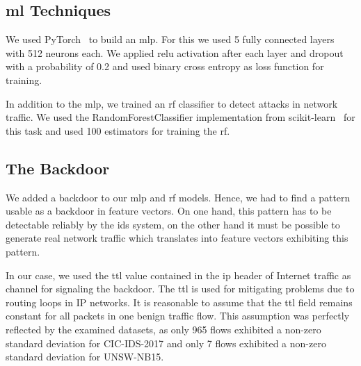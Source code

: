 \documentclass[9pt,sigconf,letterpaper,dvipsnames\ifx\removeHeaders\tempYes ,nonacm\fi]{acmart}
\newcommand{\unsw}{UNSW-NB15}
\newcommand{\cic}{CIC-IDS-2017}
\begin{document}
\subsection{\gls{ml} Techniques}
We used PyTorch~\cite{paszke_automatic_2017} to build an \gls{mlp}.
For this we used 5 fully connected layers with 512 neurons each. We applied \gls{relu} activation after each layer and dropout with a probability of 0.2 and used binary cross entropy  as loss function for training. %

In addition to the \gls{mlp}, we trained an \gls{rf} classifier to detect attacks in network traffic. We used the RandomForestClassifier implementation from scikit-learn~\cite{pedregosa_scikit-learn:_2011} for this task and used 100 estimators for training the \gls{rf}.

\subsection{The Backdoor}

We added a backdoor to our \gls{mlp} and \gls{rf} models. %
Hence,
we
had to find a pattern usable as a backdoor in feature vectors. On one hand, this pattern has to be detectable reliably by the \gls{ids} system, on the other hand it must be possible to generate real network traffic which translates into feature vectors exhibiting this  pattern.

In our case, we used the \gls{ttl} value contained in the \gls{ip} header of Internet traffic
as channel for signaling the backdoor.
The \gls{ttl} is used for mitigating problems due to routing loops in IP networks.
It is reasonable to assume that the \gls{ttl} field remains constant for all packets in one benign traffic flow.
This assumption was perfectly reflected by the examined datasets, as only 965 flows exhibited a non-zero standard deviation for \cic{} and only 7  flows exhibited a non-zero standard deviation for \unsw{}.
\end{document}

